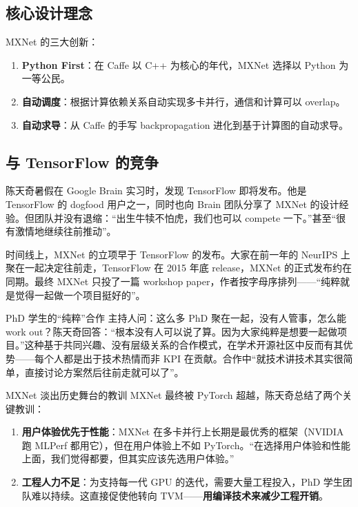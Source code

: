 \subsection{核心设计理念}

MXNet 的三大创新：
\begin{enumerate}
    \item \textbf{Python First}：在 Caffe 以 C++ 为核心的年代，MXNet 选择以 Python 为一等公民。
    \item \textbf{自动调度}：根据计算依赖关系自动实现多卡并行，通信和计算可以 overlap。
    \item \textbf{自动求导}：从 Caffe 的手写 backpropagation 进化到基于计算图的自动求导。
\end{enumerate}

\subsection{与 TensorFlow 的竞争}

陈天奇暑假在 Google Brain 实习时，发现 TensorFlow 即将发布。他是 TensorFlow 的 dogfood 用户之一，同时也向 Brain 团队分享了 MXNet 的设计经验。但团队并没有退缩：``出生牛犊不怕虎，我们也可以 compete 一下。''甚至``很有激情地继续往前推动''。

时间线上，MXNet 的立项早于 TensorFlow 的发布。大家在前一年的 NeurIPS 上聚在一起决定往前走，TensorFlow 在 2015 年底 release，MXNet 的正式发布约在同期。最终 MXNet 只投了一篇 workshop paper，作者按字母序排列------``纯粹就是觉得一起做一个项目挺好的''。

\begin{knowledgebox}{PhD 学生的``纯粹''合作}
主持人问：这么多 PhD 聚在一起，没有人管事，怎么能 work out？陈天奇回答：``根本没有人可以说了算。因为大家纯粹是想要一起做项目。''这种基于共同兴趣、没有层级关系的合作模式，在学术开源社区中反而有其优势------每个人都是出于技术热情而非 KPI 在贡献。合作中``就技术讲技术其实很简单，直接讨论方案然后往前走就可以了''。
\end{knowledgebox}

\begin{warningbox}{MXNet 淡出历史舞台的教训}
MXNet 最终被 PyTorch 超越，陈天奇总结了两个关键教训：
\begin{enumerate}
    \item \textbf{用户体验优先于性能}：MXNet 在多卡并行上长期是最优秀的框架（NVIDIA 跑 MLPerf 都用它），但在用户体验上不如 PyTorch。``在选择用户体验和性能上面，我们觉得都要，但其实应该先选用户体验。''
    \item \textbf{工程人力不足}：为支持每一代 GPU 的迭代，需要大量工程投入，PhD 学生团队难以持续。这直接促使他转向 TVM------\textbf{用编译技术来减少工程开销}。
\end{enumerate}
\end{warningbox}

